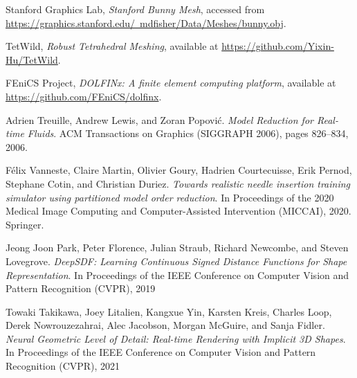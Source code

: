 \documentclass[a4paper,12pt]{article}
\begin{document}
\FloatBarrier
\newpage
\pagebreak
\begin{thebibliography}{9}
	Stanford Graphics Lab, \emph{Stanford Bunny Mesh}, accessed from \href{https://graphics.stanford.edu/~mdfisher/Data/Meshes/bunny.obj}{https://graphics.stanford.edu/~mdfisher/Data/Meshes/bunny.obj}.

	TetWild, \emph{Robust Tetrahedral Meshing}, available at \href{https://github.com/Yixin-Hu/TetWild}{https://github.com/Yixin-Hu/TetWild}.

	FEniCS Project, \emph{DOLFINx: A finite element computing platform}, available at \href{https://github.com/FEniCS/dolfinx}{https://github.com/FEniCS/dolfinx}.

	Adrien Treuille, Andrew Lewis, and Zoran Popović.
	\emph{Model Reduction for Real-time Fluids}.
	ACM Transactions on Graphics (SIGGRAPH 2006), pages 826--834, 2006.

	F{\'e}lix Vanneste, Claire Martin, Olivier Goury, Hadrien Courtecuisse, Erik Pernod, Stephane Cotin, and Christian Duriez.
	\emph{Towards realistic needle insertion training simulator using partitioned model order reduction}.
	In Proceedings of the 2020 Medical Image Computing and Computer-Assisted Intervention (MICCAI), 2020. Springer.

	Jeong Joon Park, Peter Florence, Julian Straub, Richard Newcombe, and Steven Lovegrove.
	\emph{DeepSDF: Learning Continuous Signed Distance Functions for Shape Representation}.
	In Proceedings of the IEEE Conference on Computer Vision and Pattern Recognition (CVPR), 2019

	Towaki Takikawa, Joey Litalien, Kangxue Yin, Karsten Kreis, Charles Loop, Derek Nowrouzezahrai, Alec Jacobson, Morgan McGuire, and Sanja Fidler.
	\emph{Neural Geometric Level of Detail: Real-time Rendering with Implicit 3D Shapes}.
	In Proceedings of the IEEE Conference on Computer Vision and Pattern Recognition (CVPR), 2021

\end{thebibliography}
\end{document}
